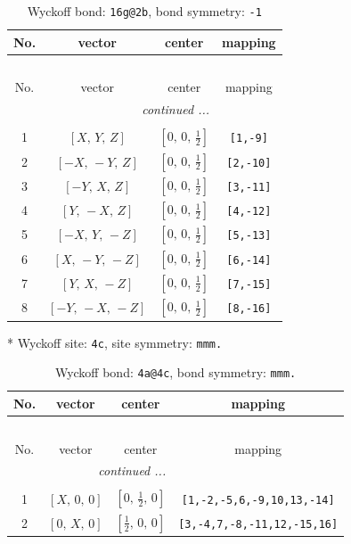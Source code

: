 \documentclass[fleqn,8pt]{jsarticle}
\begin{document}
\begin{longtable}{cccc}
\caption{Wyckoff bond: {\tt 16g@2b}, bond symmetry: {\tt -1}}
 \\
 \hline \hline
No. & vector & center & mapping \\ \hline \endfirsthead

\multicolumn{3}{l}{\tablename\ \thetable{}} \\
 \hline \hline
No. & vector & center & mapping \\ \hline \endhead

 \hline \hline
\multicolumn{3}{r}{\footnotesize\it continued ...} \\ \endfoot

 \hline \hline
\multicolumn{3}{r}{} \\ \endlastfoot

1 & $\left[ X,\, Y,\, Z \right]$ & $\left[ 0,\, 0,\, \frac{1}{2} \right]$ & {\tt [1,-9]} \\ \hline
2 & $\left[ - X,\, - Y,\, Z \right]$ & $\left[ 0,\, 0,\, \frac{1}{2} \right]$ & {\tt [2,-10]} \\ \hline
3 & $\left[ - Y,\, X,\, Z \right]$ & $\left[ 0,\, 0,\, \frac{1}{2} \right]$ & {\tt [3,-11]} \\ \hline
4 & $\left[ Y,\, - X,\, Z \right]$ & $\left[ 0,\, 0,\, \frac{1}{2} \right]$ & {\tt [4,-12]} \\ \hline
5 & $\left[ - X,\, Y,\, - Z \right]$ & $\left[ 0,\, 0,\, \frac{1}{2} \right]$ & {\tt [5,-13]} \\ \hline
6 & $\left[ X,\, - Y,\, - Z \right]$ & $\left[ 0,\, 0,\, \frac{1}{2} \right]$ & {\tt [6,-14]} \\ \hline
7 & $\left[ Y,\, X,\, - Z \right]$ & $\left[ 0,\, 0,\, \frac{1}{2} \right]$ & {\tt [7,-15]} \\ \hline
8 & $\left[ - Y,\, - X,\, - Z \right]$ & $\left[ 0,\, 0,\, \frac{1}{2} \right]$ & {\tt [8,-16]} \\
\end{longtable}
* Wyckoff site: {\tt 4c}, site symmetry: {\tt mmm.}
\renewcommand{\arraystretch}{1.2}
\begin{longtable}{cccc}
\caption{Wyckoff bond: {\tt 4a@4c}, bond symmetry: {\tt mmm.}}
 \\
 \hline \hline
No. & vector & center & mapping \\ \hline \endfirsthead

\multicolumn{3}{l}{\tablename\ \thetable{}} \\
 \hline \hline
No. & vector & center & mapping \\ \hline \endhead

 \hline \hline
\multicolumn{3}{r}{\footnotesize\it continued ...} \\ \endfoot

 \hline \hline
\multicolumn{3}{r}{} \\ \endlastfoot

1 & $\left[ X,\, 0,\, 0 \right]$ & $\left[ 0,\, \frac{1}{2},\, 0 \right]$ & {\tt [1,-2,-5,6,-9,10,13,-14]} \\ \hline
2 & $\left[ 0,\, X,\, 0 \right]$ & $\left[ \frac{1}{2},\, 0,\, 0 \right]$ & {\tt [3,-4,7,-8,-11,12,-15,16]} \\
\end{longtable}
\end{document}
